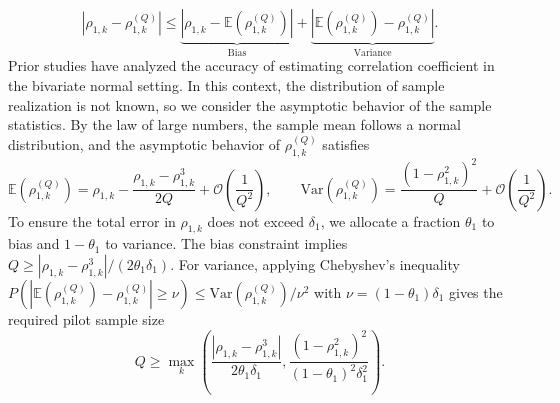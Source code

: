%
\begin{equation*}
\label{eq:MSE_rho}
    \left|\rho_{1,k} - \rho_{1,k}^{(Q)}\right|\le \underbrace{\left|\rho_{1,k} - \mathbb{E}\left(\rho_{1,k}^{(Q)}\right)\right|}_{\text{Bias}}+\underbrace{\left|\mathbb{E}\left(\rho_{1,k}^{(Q)}\right)-\rho_{1,k}^{(Q)}\right|}_{\text{Variance}}.
\end{equation*}
%
Prior studies \cite{Fi:1915, Ha:2007, Ri:1932, So:1913} have analyzed the accuracy of estimating correlation coefficient in the bivariate normal setting. In this context, the distribution of sample realization is not known, so we consider the asymptotic behavior of the sample statistics. By the law of large numbers, the sample mean follows a normal distribution, and the asymptotic behavior of $\rho_{1,k}^{(Q)}$ \cite{So:1913} satisfies 
%
\begin{equation*}
\label{eq:Expectation_var_rho}
    \mathbb{E}\left(\rho_{1,k}^{(Q)}\right) =\rho_{1,k}-\frac{\rho_{1,k}-\rho_{1,k}^3}{2Q} + \mathcal{O}\left(\frac 1 {Q^2}\right),\qquad \text{Var}\left(\rho_{1,k}^{(Q)}\right)= \frac{(1-\rho_{1,k}^2)^2}{Q} + \mathcal{O}\left(\frac{1}{Q^2}\right).
\end{equation*}
%
To ensure the total error in $\rho_{1,k}$ does not exceed $\delta_1$, we allocate a fraction $\theta_1$ to bias and $1-\theta_1$ to variance. The bias constraint implies $Q\ge |\rho_{1,k}-\rho_{1,k}^3|/(2\theta_1\delta_1)$. For variance, applying Chebyshev’s inequality $P(|\mathbb{E}(\rho_{1,k}^{(Q)})-\rho_{1,k}^{(Q)}|\ge \nu)\le \text{Var}(\rho_{1,k}^{(Q)})/\nu^2$
with $\nu = (1-\theta_1)\delta_1$ gives the required pilot sample size
%
\begin{equation}
\label{eq:Offline_Sample_Size}
    Q\ge \max_{k} \left(\frac{\left|\rho_{1,k}-\rho_{1,k}^3\right|}{2\theta_1\delta_1 }, \frac{\left(1-\rho_{1,k}^2\right)^2}{(1-\theta_1)^2\delta_1^2}\right).
\end{equation}
%
%
